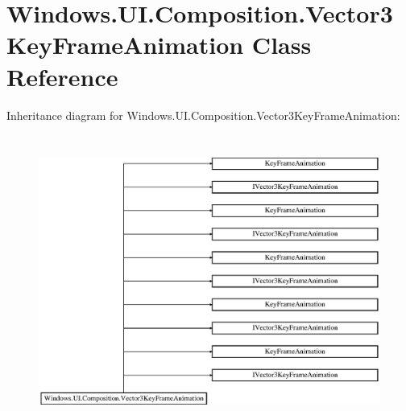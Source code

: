\hypertarget{class_windows_1_1_u_i_1_1_composition_1_1_vector3_key_frame_animation}{}\section{Windows.\+U\+I.\+Composition.\+Vector3\+Key\+Frame\+Animation Class Reference}
\label{class_windows_1_1_u_i_1_1_composition_1_1_vector3_key_frame_animation}
Inheritance diagram for Windows.\+U\+I.\+Composition.\+Vector3\+Key\+Frame\+Animation\+:\begin{figure}[H]
\begin{center}
\leavevmode
\includegraphics[height=9.655172cm]{class_windows_1_1_u_i_1_1_composition_1_1_vector3_key_frame_animation}
\end{center}
\end{figure}
